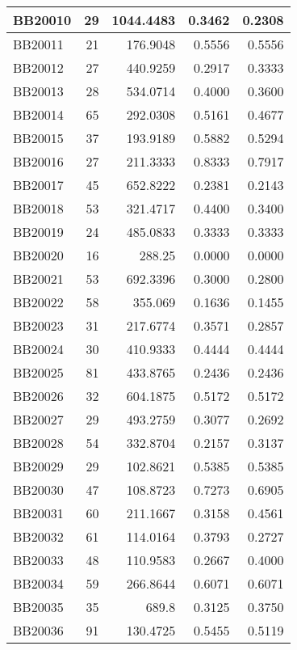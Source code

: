 \begin{longtable}{|l|r|r||r|r|}
	\hline
	BB20010 & 29    & 1044.4483 & 0.3462 & 0.2308 \\
	\hline
	BB20011 & 21    & 176.9048 & 0.5556 & 0.5556 \\
	\hline
	BB20012 & 27    & 440.9259 & 0.2917 & 0.3333 \\
	\hline
	BB20013 & 28    & 534.0714 & 0.4000 & 0.3600 \\
	\hline
	BB20014 & 65    & 292.0308 & 0.5161 & 0.4677 \\
	\hline
	BB20015 & 37    & 193.9189 & 0.5882 & 0.5294 \\
	\hline
	BB20016 & 27    & 211.3333 & 0.8333 & 0.7917 \\
	\hline
	BB20017 & 45    & 652.8222 & 0.2381 & 0.2143 \\
	\hline
	BB20018 & 53    & 321.4717 & 0.4400 & 0.3400 \\
	\hline
	BB20019 & 24    & 485.0833 & 0.3333 & 0.3333 \\
	\hline
	BB20020 & 16    & 288.25 & 0.0000 & 0.0000 \\
	\hline
	BB20021 & 53    & 692.3396 & 0.3000 & 0.2800 \\
	\hline
	BB20022 & 58    & 355.069 & 0.1636 & 0.1455 \\
	\hline
	BB20023 & 31    & 217.6774 & 0.3571 & 0.2857 \\
	\hline
	BB20024 & 30    & 410.9333 & 0.4444 & 0.4444 \\
	\hline
	BB20025 & 81    & 433.8765 & 0.2436 & 0.2436 \\
	\hline
	BB20026 & 32    & 604.1875 & 0.5172 & 0.5172 \\
	\hline
	BB20027 & 29    & 493.2759 & 0.3077 & 0.2692 \\
	\hline
	BB20028 & 54    & 332.8704 & 0.2157 & 0.3137 \\
	\hline
	BB20029 & 29    & 102.8621 & 0.5385 & 0.5385 \\
	\hline
	BB20030 & 47    & 108.8723 & 0.7273 & 0.6905 \\
	\hline
	BB20031 & 60    & 211.1667 & 0.3158 & 0.4561 \\
	\hline
	BB20032 & 61    & 114.0164 & 0.3793 & 0.2727 \\
	\hline
	BB20033 & 48    & 110.9583 & 0.2667 & 0.4000 \\
	\hline
	BB20034 & 59    & 266.8644 & 0.6071 & 0.6071 \\
	\hline
	BB20035 & 35    & 689.8 & 0.3125 & 0.3750 \\
	\hline
	BB20036 & 91    & 130.4725 & 0.5455 & 0.5119 \\

\end{longtable}
